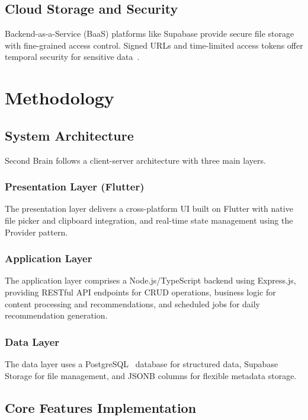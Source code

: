 \documentclass[10pt,twocolumn,a4paper]{article}
\begin{document}
\subsection{Cloud Storage and Security}

Backend-as-a-Service (BaaS) platforms like Supabase provide secure file storage with
fine-grained access control. Signed URLs and time-limited access tokens offer temporal
security for sensitive data~\cite{armbrust2010above}.

\section{Methodology}

\subsection{System Architecture}

Second Brain follows a client-server architecture with three main layers.

\subsubsection{Presentation Layer (Flutter)}
The presentation layer delivers a cross-platform UI built on Flutter with native file picker
and clipboard integration, and real-time state management using the Provider pattern.

\subsubsection{Application Layer}
The application layer comprises a Node.js/TypeScript backend using Express.js, providing
RESTful API endpoints for CRUD operations, business logic for content processing and
recommendations, and scheduled jobs for daily recommendation generation.

\subsubsection{Data Layer}
The data layer uses a PostgreSQL~\cite{postgresql2023} database for structured data,
Supabase~\cite{supabase2023} Storage for file management, and JSONB columns for flexible
metadata storage.

\subsection{Core Features Implementation}
\end{document}
